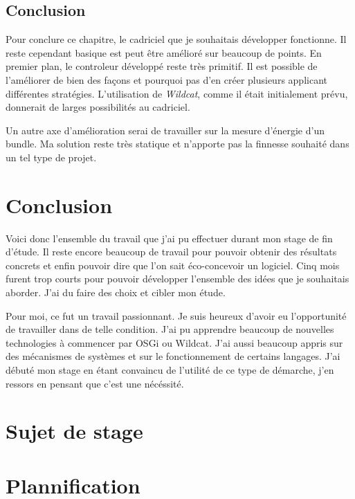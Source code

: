 \documentclass[a4paper, 11pt]{report}
\begin{document}
	\section{Conclusion}
Pour conclure ce chapitre, le cadriciel que je souhaitais développer fonctionne. Il reste cependant basique est peut être amélioré sur beaucoup de points. En premier plan, le controleur développé reste très primitif. Il est possible de l'améliorer de bien des façons et pourquoi pas d'en créer plusieurs applicant différentes stratégies. L'utilisation de \textit{Wildcat}, comme il était initialement prévu, donnerait de larges possibilités au cadriciel.

Un autre axe d'amélioration serai de travailler sur la mesure d'énergie d'un bundle. Ma solution reste très statique et n'apporte pas la finnesse souhaité dans un tel type de projet.

\chapter{Conclusion}
Voici donc l'ensemble du travail que j'ai pu effectuer durant mon stage de fin d'étude. Il reste encore beaucoup de travail pour pouvoir obtenir des résultats concrets et enfin pouvoir dire que l'on sait éco-concevoir un logiciel. Cinq mois furent trop courts pour pouvoir développer l'ensemble des idées que je souhaitais aborder. J'ai du faire des choix et cibler mon étude.

Pour moi, ce fut un travail passionnant. Je suis heureux d'avoir eu l'opportunité de travailler dans de telle condition. J'ai pu apprendre beaucoup de nouvelles technologies à commencer par OSGi ou Wildcat. J'ai aussi beaucoup appris sur des mécanismes de systèmes et sur le fonctionnement de certains langages. J'ai débuté mon stage en étant convaincu de l'utilité de ce type de démarche, j'en ressors en pensant que c'est une nécéssité.



\listoffigures{}
\appendix

\chapter{Sujet de stage}




\chapter{Plannification}

\end{document}
